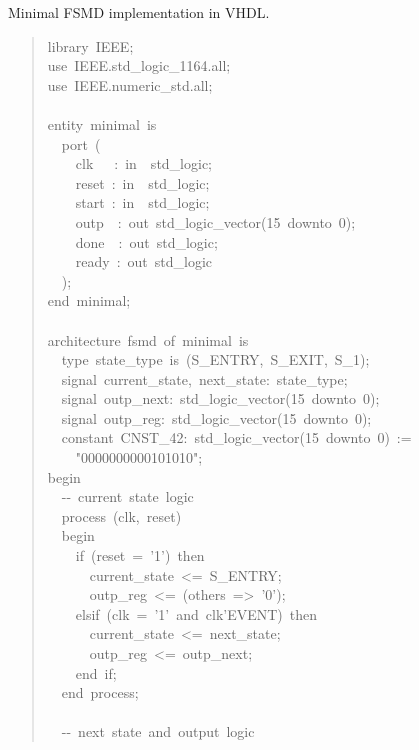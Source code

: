 \documentclass[a4paper]{article}
\begin{document}
\label{fsmd-minimal-vhdl}
Minimal FSMD implementation in VHDL.
%
\begin{quote}{\ttfamily \raggedright \noindent
library~IEEE;\\
use~IEEE.std\_logic\_1164.all;\\
use~IEEE.numeric\_std.all;\\
~\\
entity~minimal~is\\
~~port~(\\
~~~~clk~~~:~in~~std\_logic;\\
~~~~reset~:~in~~std\_logic;\\
~~~~start~:~in~~std\_logic;\\
~~~~outp~~:~out~std\_logic\_vector(15~downto~0);\\
~~~~done~~:~out~std\_logic;\\
~~~~ready~:~out~std\_logic\\
~~);\\
end~minimal;\\
~\\
architecture~fsmd~of~minimal~is\\
~~type~state\_type~is~(S\_ENTRY,~S\_EXIT,~S\_1);\\
~~signal~current\_state,~next\_state:~state\_type;\\
~~signal~outp\_next:~std\_logic\_vector(15~downto~0);\\
~~signal~outp\_reg:~std\_logic\_vector(15~downto~0);\\
~~constant~CNST\_42:~std\_logic\_vector(15~downto~0)~:=\\
~~~~"0000000000101010";\\
begin\\
~~-{}-~current~state~logic\\
~~process~(clk,~reset)\\
~~begin\\
~~~~if~(reset~=~'1')~then\\
~~~~~~current\_state~<=~S\_ENTRY;\\
~~~~~~outp\_reg~<=~(others~=>~'0');\\
~~~~elsif~(clk~=~'1'~and~clk'EVENT)~then\\
~~~~~~current\_state~<=~next\_state;\\
~~~~~~outp\_reg~<=~outp\_next;\\
~~~~end~if;\\
~~end~process;\\
~\\
~~-{}-~next~state~and~output~logic\\
}
\end{quote}
\end{document}
